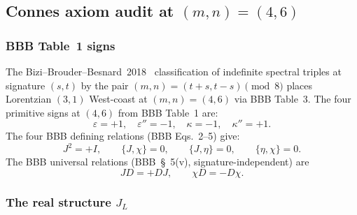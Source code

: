 \documentclass[11pt,a4paper]{article}
\theoremstyle{plain}
\theoremstyle{definition}
\newcommand{\JL}{J_{L}}
\begin{document}
\subsection{Connes axiom audit at $(m, n) = (4, 6)$}\label{sec:bbb_audit}

\subsubsection{BBB Table~1 signs}

The Bizi--Brouder--Besnard~2018~\cite{bizi_brouder_besnard2018}
classification of indefinite spectral triples at signature
$(s, t)$ by the pair $(m, n) = (t + s, t - s) \pmod 8$ places
Lorentzian $(3, 1)$ West-coast at $(m, n) = (4, 6)$ via BBB Table~3.
The four primitive signs at $(4, 6)$ from BBB Table~1 are:
\begin{equation}\label{eq:bbb_signs}
   \varepsilon = +1, \quad
   \varepsilon'' = -1, \quad
   \kappa = -1, \quad
   \kappa'' = +1.
\end{equation}
The four BBB defining relations (BBB Eqs.~2--5) give:
\begin{equation}\label{eq:bbb_relations}
   \boxed{\;
   J^2 = +I, \qquad
   \{J, \chi\} = 0, \qquad
   \{J, \eta\} = 0, \qquad
   \{\eta, \chi\} = 0. \;
   }
\end{equation}
The BBB universal relations (BBB~\S~5(v), signature-independent) are
\begin{equation}\label{eq:bbb_universal}
   \boxed{\;
   J D = +D J, \qquad
   \chi D = -D \chi. \;}
\end{equation}

\subsubsection{The real structure $\JL$}
\end{document}
